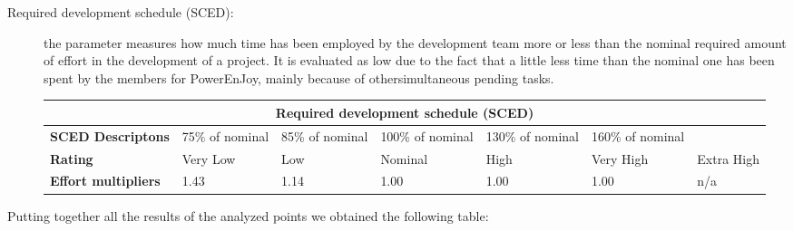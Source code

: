 \begin{description}
\item[Required development schedule (SCED):] the parameter measures how much time has been employed by the development team more or less than the nominal required amount of effort in the development of a project. It is evaluated as low due to the fact that a little less time than the nominal one has been spent by the members for PowerEnJoy, mainly because of othersimultaneous pending tasks.

\begin{tabular}{|p{}|p{}|p{}|p{}|p{}|p{}|p{}|}
\hline
         \multicolumn{7}{|c|}{\textbf{Required development schedule (SCED)}} \\ \hline  \hline
         	\textbf{SCED Descriptons} &75\% of nominal &85\% of nominal &100\% of nominal &130\% of nominal &160\% of nominal &\\ \hline
	\textbf{Rating}&Very Low & Low & Nominal  & High & Very High &Extra High\\ \hline
	\textbf{Effort multipliers} & 1.43 & 1.14 & 1.00 & 1.00 &  1.00 & n/a \\ \hline
\end{tabular}
\end{description}

Putting together all the results of the analyzed points we obtained the following table:

